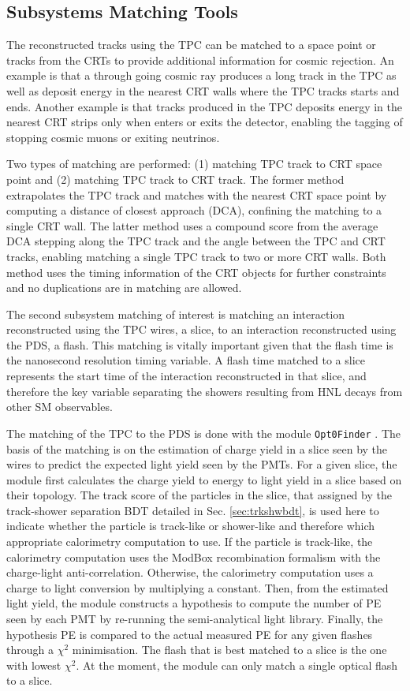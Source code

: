\subsection{Subsystems Matching Tools}
\label{sec:subsystem_match}

The reconstructed tracks using the TPC can be matched to a space point or tracks from the CRTs to provide additional information for cosmic rejection.
An example is that a through going cosmic ray produces a long track in the TPC as well as deposit energy in the nearest CRT walls where the TPC tracks starts and ends. 
Another example is that tracks produced in the TPC deposits energy in the nearest CRT strips only when enters or exits the detector, enabling the tagging of stopping cosmic muons or exiting neutrinos.

Two types of matching are performed: (1) matching TPC track to CRT space point and (2) matching TPC track to CRT track.
The former method extrapolates the TPC track and matches with the nearest CRT space point by computing a distance of closest approach (DCA), confining the matching to a single CRT wall.
The latter method uses a compound score from the average DCA stepping along the TPC track and the angle between the TPC and CRT tracks, enabling matching a single TPC track to two or more CRT walls.
Both method uses the timing information of the CRT objects for further constraints and no duplications are in matching are allowed.

The second subsystem matching of interest is matching an interaction reconstructed using the TPC wires, a slice, to an interaction reconstructed using the PDS, a flash.
This matching is vitally important given that the flash time is the nanosecond resolution timing variable.
A flash time matched to a slice represents the start time of the interaction reconstructed in that slice, and therefore the key variable separating the showers resulting from HNL decays from other SM observables.

The matching of the TPC to the PDS is done with the module \texttt{Opt0Finder} \cite{}.
The basis of the matching is on the estimation of charge yield in a slice seen by the wires to predict the expected light yield seen by the PMTs.
For a given slice, the module first calculates the charge yield to energy to light yield in a slice based on their topology.
The track score of the particles in the slice, that assigned by the track-shower separation BDT detailed in Sec. \ref{sec:trkshwbdt}, is used here to indicate whether the particle is track-like or shower-like and therefore which appropriate calorimetry computation to use.
If the particle is track-like, the calorimetry computation uses the ModBox recombination formalism with the charge-light anti-correlation. 
Otherwise, the calorimetry computation uses a charge to light conversion by multiplying a constant.
Then, from the estimated light yield, the module constructs a hypothesis to compute the number of PE seen by each PMT by re-running the semi-analytical light library.
Finally, the hypothesis PE is compared to the actual measured PE for any given flashes through a $\chi^2$ minimisation.
The flash that is best matched to a slice is the one with lowest $\chi^2$.
At the moment, the module can only match a single optical flash to a slice.

